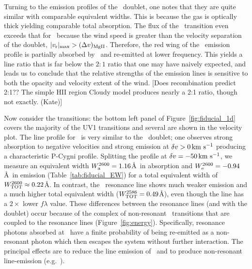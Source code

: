 \documentclass[12pt,preprint]{aastex}
\begin{document}
Turning to the emission profiles of the \mgiid\ doublet, one notes
that they are quite similar with comparable equivalent widths.
This is because the gas is optically
thick yielding comparable total absorption. The
flux of the \mgiib\ transition even exceeds that for \mgiia\ 
because the wind speed is greater than the velocity separation
of the doublet, $|v_{\rm r}|_{\rm max} > (\Delta v)_{\rm MgII}$.
Therefore, the red wing of the
\mgiia\ emission profile is partially absorbed by \mgiib\ and
re-emitted at lower frequency.
This yields a
line ratio that is far below the $2:1$ ratio that one may have naively
expected, and leads us to conclude that the relative
strengths of the emission lines is sensitive to both the opacity and
velocity extent of the wind. 
[Does recombination predict 2:1??  The simple HII region Cloudy model
produces nearly a 2:1 ratio, though not exactly. (Kate)]

Now consider the  transitions:
the bottom left panel of Figure~\ref{fig:fiducial_1d} covers the
majority of the \ion{Fe}{2} UV1 transitions and several are
shown in the velocity plot.  The line
profile for \feiib\ is very similar to the \mgiid\ doublet;
one observes strong absorption to negative velocities and strong
emission at $\delta v > 0 \, {\rm km~s^{-1}}$ producing a characteristic P-Cygni profile. 
Splitting
the profile at $\delta v = -50 \, {\rm km~s^{-1}}$, we measure an equivalent width
$W^{2600}_{\rm a} = 1.16$\AA\ in absorption and $W^{2600}_{\rm e} =
-0.94$\AA\ in emission (Table~\ref{tab:fiducial_EW}) for a total
equivalent width of $W^{2600}_{\rm TOT} \approx 0.22$\AA.  
In contrast, the \feiia\ resonance line shows much weaker emission and
a much higher total equivalent width ($W^{2586}_{\rm TOT} = 0.49$\AA),
even though the line has a $2 \times$ lower $f\lambda$ value.
These differences between the  resonance lines (and with the
\ion{Mg}{2} doublet) occur because of the complex of non-resonant
\feiis\ transitions that are coupled to the resonance lines
(Figure~\ref{fig:energy}).  Specifically, 
resonance photons absorbed at \feiid\ have a finite probability of
being re-emitted as a non-resonant photon which then escapes the system
without further interaction.  The principal effects are to reduce the
line emission of \feiid\ and to produce non-resonant line-emission (e.g.\
\feiic).
\end{document}

